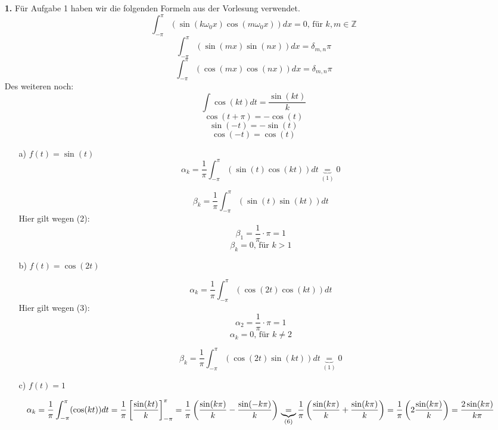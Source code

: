 \documentclass [a4paper,11pt]{article}
\author{\authorinfotitle}
\title{\titleinfo}
\date{\today}
\begin{document}
	\maketitle
	\begin{enumerate}
		\item[\textbf{1.}]
		Für Aufgabe 1 haben wir die folgenden Formeln aus der Vorlesung verwendet.
		\begin{equation}
		\int_{-\pi}^\pi(\sin(k\omega_0x)\cos(m\omega_0x))dx = 0 \text{, für } k,m\in \mathbb{Z}
		\end{equation}
		\begin{equation}
		\int_{-\pi}^{\pi}(\sin(mx)\sin(nx))dx = \delta_{m,n}\pi
		\end{equation}
		\begin{equation}
		\int_{-\pi}^{\pi}(\cos(mx)\cos(nx))dx = \delta_{m,n}\pi
		\end{equation}
		Des weiteren noch:
		\begin{equation}
		\int \cos(kt)dt = \frac{\sin(kt)}{k}
		\end{equation}
		\begin{equation}
		\cos(t+\pi) = -\cos(t)
		\end{equation}
		\begin{equation}
		\sin(-t) = -\sin(t)
		\end{equation}
		\begin{equation}
		\cos(-t) = \cos(t)
		\end{equation}
		\begin{enumerate}
			\item[a)] $f(t) = \sin(t)$
			$$\alpha_k = \frac{1}{\pi} \int_{-\pi}^{\pi}(\sin(t)\cos(kt))dt \underbrace{=}_{(1)} 0$$

			$$\beta_k = \frac{1}{\pi} \int_{-\pi}^{\pi}(\sin(t)\sin(kt))dt$$
			Hier gilt wegen (2):
			$$\beta_1 = \frac{1}{\pi} \cdot \pi = 1$$
			$$\beta_k = 0 \text{, für } k > 1$$

			\item[b)] $f(t) = \cos(2t)$

			$$\alpha_k = \frac{1}{\pi}\int_{-\pi}^{\pi}(\cos(2t)\cos(kt))dt$$
			Hier gilt wegen (3):
			$$\alpha_2 = \frac{1}{\pi} \cdot \pi = 1$$
			$$\alpha_k = 0 \text{, für } k\neq2$$

			$$\beta_k = \frac{1}{\pi}\int_{-\pi}^{\pi}(\cos(2t)\sin(kt))dt \underbrace{=}_{(1)} 0$$

			\item[c)] $f(t) = 1$

			\begin{dmath*}
				\alpha_k = \frac{1}{\pi}\int_{-\pi}^{\pi}(\cos(kt))dt
				= \frac{1}{\pi}\left[ \frac{\sin(kt)}{k}\right]_{-\pi}^{\pi}
				= \frac{1}{\pi}\left(\frac{\sin(k\pi)}{k}-\frac{\sin(-k\pi)}{k} \right) \\
				\underbrace{=}_{(6)} \frac{1}{\pi}\left(\frac{\sin(k\pi)}{k}+\frac{\sin(k\pi)}{k} \right)
				= \frac{1}{\pi}\left(2\frac{\sin(k\pi)}{k} \right)
				= \frac{2\sin(k\pi)}{k\pi}
			\end{dmath*}


\end{enumerate}
\end{enumerate}
\end{document}
